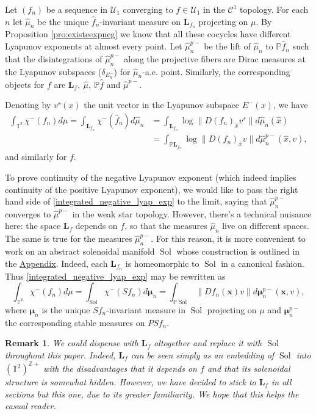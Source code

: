 \documentclass[11pt,letterpaper,reqno]{article}
\newtheorem{remark}{Remark}[section]
\newcommand{\Pp}{\mathbb P}
\newcommand{\Z}{\mathbb{Z}}
\newcommand{\TT}{\mathbb{T}^2}
\newcommand{\hTTf}[1][f]{\mathbf{L}_{#1}}
\newcommand{\hf}{\hat{f}}
\newcommand{\bmu}{\boldsymbol{\mu}}
\newcommand{\hmu}{\hat{\mu}}
\newcommand{\hx}[1][x]{\hat{#1}}
\newcommand{\Sol}{\operatorname{Sol}}
\newcommand{\fsol}{Sf}
\newcommand{\bx}{\mathbf{x}}
\begin{document}
Let $(f_n)$ be a sequence in $\mathcal U_1$ converging to $f\in\mathcal U_1$ in the $\mathcal C^1$ topology. For each $n$ let $\hmu_n$ be the unique $\hf_n$-invariant measure on $\hTTf[f_n]$ projecting on $\mu$. By Proposition \ref{pro:existeexpneg} we know that all these cocycles have different Lyapunov exponents at almost every point. Let $\hat\mu_n^{p-}$ be the lift of $\hat\mu_n$ to $\Pp \hat f_n$ such that the disintegrations of $\hat\mu_n^{p-}$ along the projective fibers are Dirac measures at the Lyapunov subspaces ($\delta_{E^-_n}$) for $\hat\mu_n$-a.e. point. Similarly, the corresponding objects for $f$ are  $\hTTf,\ \hat\mu,\ \Pp\hat{f}$ and $\hat\mu^{p-}$.

Denoting by $v^s(x)$ the unit vector in the Lyapunov subspace $E^-(x)$, we have
\begin{align} \label{integrated_negative_lyap_exp}
\nonumber\int_{\mathbb T^2}\chi^-(f_n)d\mu=\int_{\hTTf[f_n]}\chi^-(\hf_n)d\hmu_n&=\int_{\hTTf[f_n]}\log\|D(f_n)_{\hx}v^s\|d\hmu_n(\hat x)\\
&=\int_{\Pp \hTTf[f_n]}\log\|D(f_n)_{\hat x}v\|d\hmu_n^{p-}(\hat x,v),
\end{align}
and similarly for $f$. 


To prove continuity of the negative Lyapunov exponent (which indeed implies continuity of the positive Lyapunov exponent), we would like to pass the right hand side of \eqref{integrated_negative_lyap_exp} to the limit, saying that $\hmu_n^{p-}$ converges to $\hmu^{p-}$ in the weak star topology. However, there's a technical nuisance here: the space $\hTTf$  depends on $f$, so that the measures $\hmu_n$ live on different spaces. The same is true for the measures $\hmu_n^{p-}$. For this reason, it is more convenient to work on an abstract solenoidal manifold $\Sol$ whose construction is outlined in the \hyperlink{sec:appendix}{Appendix}. Indeed, each $\hTTf[f_n]$ is homeomorphic to $\Sol$ in a canonical fashion. Thus \eqref{integrated_negative_lyap_exp} may be rewritten as 
\begin{equation} \label{integrated_negative_luap_exp_2}
\int_{\mathbb T^2}\chi^-(f_n)d\mu=\int_{\Sol}\chi^-(\fsol_n)d\bmu_n= \int_{\Pp \Sol}\|D f_n({\bx}) v\|d\bmu_n^{p-}(\bx,v),
\end{equation}
where $\bmu_n$ is the unique $\fsol_n$-invariant measure in $\Sol$ projecting on $\mu$ and $\bmu_n^{p-}$ the corresponding stable measures on $P \fsol_n$.


\begin{remark}
We could dispense with $\hTTf$ altogether and replace it with $\Sol$ throughout this paper. Indeed, $\hTTf$ can be seen simply as an embedding of $\Sol$ into $(\TT)^{\Z+}$ with the disadvantages that it depends on $f$ and that its solenoidal structure is somewhat hidden. However, we have decided to stick to $\hTTf$ in all sections but this one, due to its greater familiarity. We hope that this helps the casual reader.
\end{remark}
\end{document}
